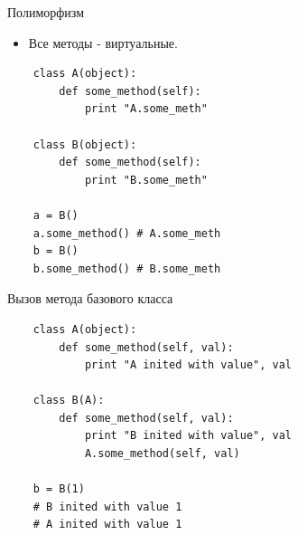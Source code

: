 \documentclass{article}
\begin{document}
\begin{center} Полиморфизм \end{center}
\begin{itemize}
    \item Все методы - виртуальные.
\end{itemize}
{
\Large
\vspace{15pt}
\begin{lstlisting}
    class A(object):
        def some_method(self):
            print "A.some_meth"

    class B(object):
        def some_method(self):
            print "B.some_meth"

    a = B() 
    a.some_method() # A.some_meth
    b = B() 
    b.some_method() # B.some_meth

\end{lstlisting}
}
\newpage

\begin{center} Вызов метода базового класса \end{center}
{
\Large
\vspace{15pt}
\begin{lstlisting}
    class A(object):
        def some_method(self, val):
            print "A inited with value", val

    class B(A):
        def some_method(self, val):
            print "B inited with value", val
            A.some_method(self, val)

    b = B(1) 
    # B inited with value 1
    # A inited with value 1
\end{lstlisting}
}
\newpage
\end{document}
